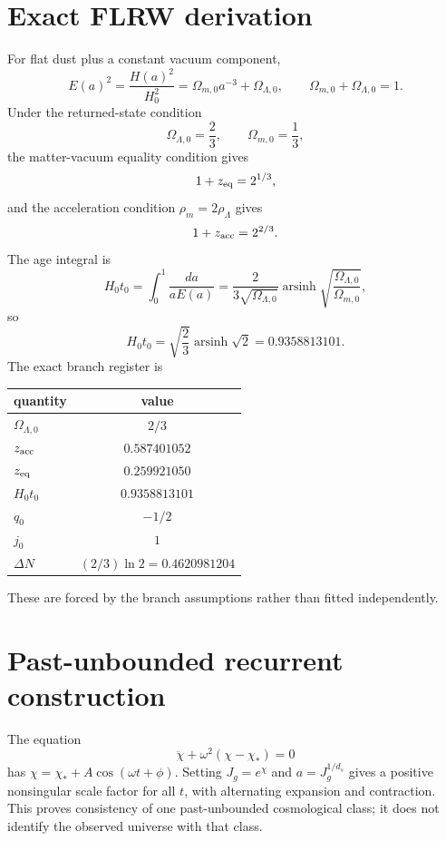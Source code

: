 \documentclass[11pt,a4paper]{article}
\begin{document}
\section{Exact FLRW derivation}
For flat dust plus a constant vacuum component,
\begin{equation}
E(a)^2=\frac{H(a)^2}{H_0^2}=\Omega_{m,0}a^{-3}+\Omega_{\Lambda,0},
\qquad \Omega_{m,0}+\Omega_{\Lambda,0}=1.
\end{equation}
Under the returned-state condition
\begin{equation}
\Omega_{\Lambda,0}=\frac23,\qquad \Omega_{m,0}=\frac13,
\end{equation}
the matter-vacuum equality condition gives
\begin{equation}
1+z_{\rm eq}=2^{1/3},
\end{equation}
and the acceleration condition $\rho_m=2\rho_\Lambda$ gives
\begin{equation}
1+z_{\rm acc}=2^{2/3}.
\end{equation}
The age integral is
\begin{equation}
H_0t_0=\int_0^1\frac{da}{aE(a)}
=\frac{2}{3\sqrt{\Omega_{\Lambda,0}}}
\operatorname{arsinh}\sqrt{\frac{\Omega_{\Lambda,0}}{\Omega_{m,0}}},
\end{equation}
so
\begin{equation}
H_0t_0=\sqrt{\frac23}\operatorname{arsinh}\sqrt2=0.9358813101.
\end{equation}
The exact branch register is
\begin{center}
\begin{tabular}{lc}
\toprule
quantity&value\\\midrule
$\Omega_{\Lambda,0}$&$2/3$\\
$z_{\rm acc}$&$0.587401052$\\
$z_{\rm eq}$&$0.259921050$\\
$H_0t_0$&$0.9358813101$\\
$q_0$&$-1/2$\\
$j_0$&$1$\\
$\Delta N$&$(2/3)\ln2=0.4620981204$\\
\bottomrule
\end{tabular}
\end{center}
These are forced by the branch assumptions rather than fitted independently.

\section{Past-unbounded recurrent construction}
The equation
\begin{equation}
\ddot\chi+\omega^2(\chi-\chi_*)=0
\end{equation}
has $\chi=\chi_*+A\cos(\omega t+\phi)$. Setting $J_g=e^\chi$ and $a=J_g^{1/d_s}$ gives a positive nonsingular scale factor for all $t$, with alternating expansion and contraction. This proves consistency of one past-unbounded cosmological class; it does not identify the observed universe with that class.
\end{document}
